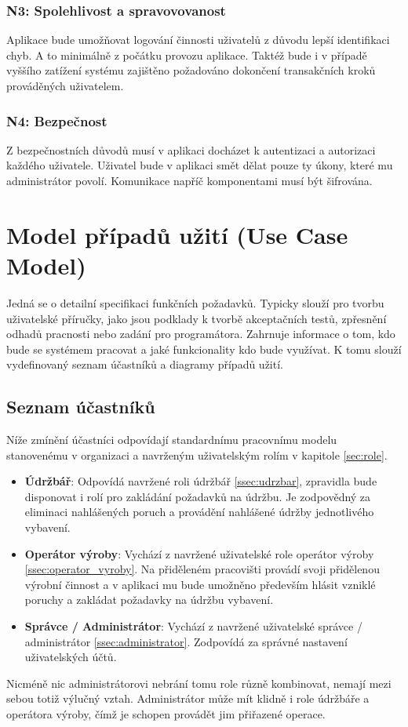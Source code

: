 \documentclass[thesis=M,czech]{FITthesis}[2012/06/26]
\begin{document}
\subsubsection{N3: Spolehlivost a spravovovanost}
Aplikace bude umožňovat logování činnosti uživatelů z důvodu lepší identifikaci chyb. A to minimálně z počátku provozu aplikace. Taktéž bude i v případě vyššího zatížení systému zajištěno požadováno dokončení transakčních kroků prováděných uživatelem.
\subsubsection{N4: Bezpečnost}
Z bezpečnostních důvodů musí v aplikaci docházet k autentizaci a autorizaci každého uživatele. Uživatel bude v aplikaci smět dělat pouze ty úkony, které mu administrátor povolí. Komunikace napříč komponentami musí být šifrována.

\section{Model případů užití (Use Case Model)}
Jedná se o detailní specifikaci funkčních požadavků. Typicky slouží pro tvorbu uživatelské příručky, jako jsou podklady k tvorbě akceptačních testů, zpřesnění odhadů pracnosti nebo zadání pro programátora. Zahrnuje informace o tom, kdo bude se systémem pracovat a jaké funkcionality kdo bude využívat. K tomu slouží vydefinovaný seznam účastníků a diagramy případů užití.

\subsection{Seznam účastníků}
\label{ssec:seznam_ucastniku}
Níže zmínění účastníci odpovídají standardnímu pracovnímu modelu stanovenému v organizaci a navrženým uživatelským rolím v kapitole \ref{sec:role}.
\begin{itemize}
	\item
	\textbf{Údržbář}: Odpovídá navržené roli údržbář \ref{ssec:udrzbar}, zpravidla bude disponovat i rolí pro zakládání požadavků na údržbu. Je zodpovědný za eliminaci nahlášených poruch a provádění nahlášené údržby jednotlivého vybavení.
	\item
	\textbf{Operátor výroby}: Vychází z navržené uživatelské role operátor výroby \ref{ssec:operator_vyroby}. Na přiděleném pracovišti provádí svoji přidělenou výrobní činnost a v aplikaci mu bude umožněno především hlásit vzniklé poruchy a zakládat požadavky na údržbu vybavení. 
	\item
	\textbf{Správce / Administrátor}: Vychází z navržené uživatelské správce / administrátor \ref{ssec:administrator}. Zodpovídá za správné nastavení uživatelských účtů.
\end{itemize} 	
Nicméně nic administrátorovi nebrání tomu role různě kombinovat, nemají mezi sebou totiž výlučný vztah. Administrátor může mít klidně i role údržbáře a operátora výroby, čímž je schopen provádět jim přiřazené operace.
\end{document}
